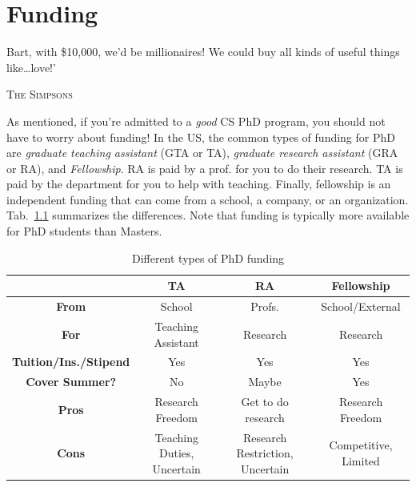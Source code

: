 \documentclass[oneside,11pt]{memoir}
\begin{document}
\chapter{Funding}\label{sec:funding}

\epigraph{Bart, with \$10,000, we’d be millionaires! We could buy all kinds of useful things like…love!’}{\textsc{The Simpsons}}

As mentioned, if you're admitted to a \emph{good} CS PhD program, you should not have to worry about funding!  
In the US, the common types of funding for PhD are \emph{graduate teaching assistant} (GTA or TA), \emph{graduate research assistant} (GRA or RA), and \emph{Fellowship}.
RA is paid by a prof. for you to do their research. TA is paid by the department for you to help with teaching. Finally, fellowship is an independent funding that can come from a school, a company, or an organization. Tab.~\ref{tab:funding} summarizes the differences.
Note that funding is typically more available for PhD students than 
Masters. %

\begin{table}
  \centering
  \footnotesize
  \caption{Different types of PhD funding}\label{tab:funding}
  \begin{tabular}{c|c|c|c}
    \toprule
    &\textbf{TA}&\textbf{RA}&\textbf{Fellowship}\\
    \midrule
    \textbf{From} & School & Profs. & School/External\\
    \textbf{For}                  & Teaching Assistant       & Research                        & Research                              \\
    \textbf{Tuition/Ins./Stipend} & Yes                      & Yes                             & Yes                                   \\
    \textbf{Cover Summer?}              & No                       & Maybe                           & Yes                                   \\
    \midrule
    \textbf{Pros}                 & Research Freedom         & Get to do research              & Research Freedom                      \\
    \textbf{Cons}                 & Teaching Duties, Uncertain            & Research Restriction, Uncertain & Competitive, Limited             \\
    \bottomrule
  \end{tabular}
\end{table}
\end{document}
